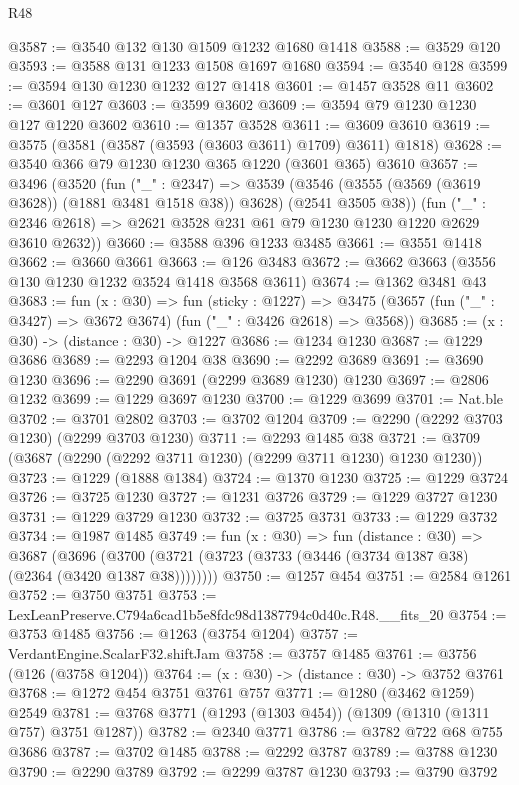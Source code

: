 \begin{lexlean}{R48}
\begin{coremodule}
@3587 := @3540 @132 @130 @1509 @1232 @1680 @1418
@3588 := @3529 @120
@3593 := @3588 @131 @1233 @1508 @1697 @1680
@3594 := @3540 @128
@3599 := @3594 @130 @1230 @1232 @127 @1418
@3601 := @1457 @3528 @11
@3602 := @3601 @127
@3603 := @3599 @3602
@3609 := @3594 @79 @1230 @1230 @127 @1220 @3602
@3610 := @1357 @3528
@3611 := @3609 @3610
@3619 := @3575 (@3581 (@3587 (@3593 (@3603 @3611) @1709) @3611) @1818)
@3628 := @3540 @366 @79 @1230 @1230 @365 @1220 (@3601 @365) @3610
@3657 := @3496
    (@3520
      (fun ("_" : @2347) =>
      @3539 (@3546 (@3555 (@3569 (@3619 @3628)) (@1881 @3481 @1518 @38)) @3628) (@2541 @3505 @38))
      (fun ("_" : @2346 @2618) => @2621 @3528 @231 @61 @79 @1230 @1230 @1220 @2629 @3610 @2632))
@3660 := @3588 @396 @1233 @3485
@3661 := @3551 @1418
@3662 := @3660 @3661
@3663 := @126 @3483
@3672 := @3662 @3663 (@3556 @130 @1230 @1232 @3524 @1418 @3568 @3611)
@3674 := @1362 @3481 @43
@3683 := fun (x : @30) =>
  fun (sticky : @1227) =>
  @3475 (@3657 (fun ("_" : @3427) => @3672 @3674) (fun ("_" : @3426 @2618) => @3568))
@3685 := (x : @30) -> (distance : @30) -> @1227
@3686 := @1234 @1230
@3687 := @1229 @3686
@3689 := @2293 @1204 @38
@3690 := @2292 @3689
@3691 := @3690 @1230
@3696 := @2290 @3691 (@2299 @3689 @1230) @1230
@3697 := @2806 @1232
@3699 := @1229 @3697 @1230
@3700 := @1229 @3699
@3701 := Nat.ble
@3702 := @3701 @2802
@3703 := @3702 @1204
@3709 := @2290 (@2292 @3703 @1230) (@2299 @3703 @1230)
@3711 := @2293 @1485 @38
@3721 := @3709 (@3687 (@2290 (@2292 @3711 @1230) (@2299 @3711 @1230) @1230 @1230))
@3723 := @1229 (@1888 @1384)
@3724 := @1370 @1230
@3725 := @1229 @3724
@3726 := @3725 @1230
@3727 := @1231 @3726
@3729 := @1229 @3727 @1230
@3731 := @1229 @3729 @1230
@3732 := @3725 @3731
@3733 := @1229 @3732
@3734 := @1987 @1485
@3749 := fun (x : @30) =>
  fun (distance : @30) =>
  @3687 (@3696 (@3700 (@3721 (@3723 (@3733 (@3446 (@3734 @1387 @38) (@2364 (@3420 @1387 @38))))))))
@3750 := @1257 @454
@3751 := @2584 @1261
@3752 := @3750 @3751
@3753 := LexLeanPreserve.C794a6cad1b5e8fdc98d1387794c0d40c.R48.__fits_20
@3754 := @3753 @1485
@3756 := @1263 (@3754 @1204)
@3757 := VerdantEngine.ScalarF32.shiftJam
@3758 := @3757 @1485
@3761 := @3756 (@126 (@3758 @1204))
@3764 := (x : @30) -> (distance : @30) -> @3752 @3761
@3768 := @1272 @454 @3751 @3761 @757
@3771 := @1280 (@3462 @1259) @2549
@3781 := @3768 @3771 (@1293 (@1303 @454)) (@1309 (@1310 (@1311 @757) @3751 @1287))
@3782 := @2340 @3771
@3786 := @3782 @722 @68 @755 @3686
@3787 := @3702 @1485
@3788 := @2292 @3787
@3789 := @3788 @1230
@3790 := @2290 @3789
@3792 := @2299 @3787 @1230
@3793 := @3790 @3792

\end{coremodule}
\end{lexlean}
